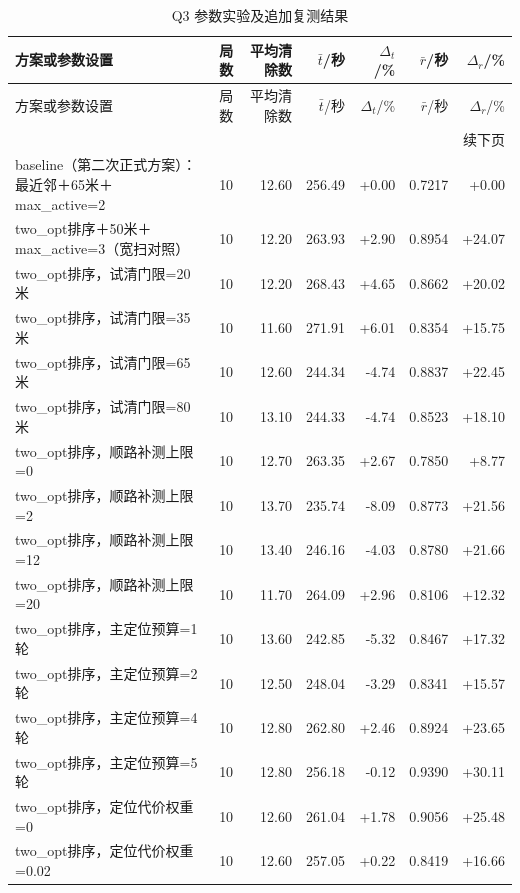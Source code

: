 \begingroup\small\setlength{\tabcolsep}{3pt}
\begin{longtable}{p{}rrrrrr}
\caption{Q3 参数实验及追加复测结果}\label{tab:official-q3-3}\\
\toprule
方案或参数设置 & 局数 & 平均清除数 & $\bar t$/秒 & $\Delta_t$/\% & $\bar r$/秒 & $\Delta_r$/\% \\
\midrule\endfirsthead
\toprule
方案或参数设置 & 局数 & 平均清除数 & $\bar t$/秒 & $\Delta_t$/\% & $\bar r$/秒 & $\Delta_r$/\% \\
\midrule\endhead
\midrule\multicolumn{7}{r}{续下页}\\\endfoot
\bottomrule\endlastfoot
baseline（第二次正式方案）：最近邻＋65米＋max\_active=2 & 10 & 12.60 & 256.49 & +0.00 & 0.7217 & +0.00 \\
two\_opt排序＋50米＋max\_active=3（宽扫对照） & 10 & 12.20 & 263.93 & +2.90 & 0.8954 & +24.07 \\
two\_opt排序，试清门限=20米 & 10 & 12.20 & 268.43 & +4.65 & 0.8662 & +20.02 \\
two\_opt排序，试清门限=35米 & 10 & 11.60 & 271.91 & +6.01 & 0.8354 & +15.75 \\
two\_opt排序，试清门限=65米 & 10 & 12.60 & 244.34 & -4.74 & 0.8837 & +22.45 \\
two\_opt排序，试清门限=80米 & 10 & 13.10 & 244.33 & -4.74 & 0.8523 & +18.10 \\
two\_opt排序，顺路补测上限=0 & 10 & 12.70 & 263.35 & +2.67 & 0.7850 & +8.77 \\
two\_opt排序，顺路补测上限=2 & 10 & 13.70 & 235.74 & -8.09 & 0.8773 & +21.56 \\
two\_opt排序，顺路补测上限=12 & 10 & 13.40 & 246.16 & -4.03 & 0.8780 & +21.66 \\
two\_opt排序，顺路补测上限=20 & 10 & 11.70 & 264.09 & +2.96 & 0.8106 & +12.32 \\
two\_opt排序，主定位预算=1轮 & 10 & 13.60 & 242.85 & -5.32 & 0.8467 & +17.32 \\
two\_opt排序，主定位预算=2轮 & 10 & 12.50 & 248.04 & -3.29 & 0.8341 & +15.57 \\
two\_opt排序，主定位预算=4轮 & 10 & 12.80 & 262.80 & +2.46 & 0.8924 & +23.65 \\
two\_opt排序，主定位预算=5轮 & 10 & 12.80 & 256.18 & -0.12 & 0.9390 & +30.11 \\
two\_opt排序，定位代价权重=0 & 10 & 12.60 & 261.04 & +1.78 & 0.9056 & +25.48 \\
two\_opt排序，定位代价权重=0.02 & 10 & 12.60 & 257.05 & +0.22 & 0.8419 & +16.66 \\

\end{longtable}
